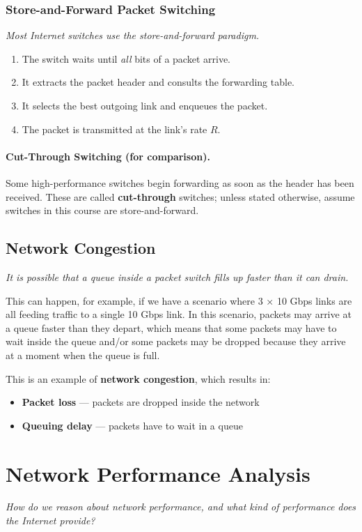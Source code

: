 \documentclass[../../compsys.tex]{subfiles}
\begin{document}
\subsubsection{Store-and-Forward Packet Switching}
\textit{Most Internet switches use the store-and-forward paradigm.}
\begin{enumerate}
  \item The switch waits until \emph{all} bits of a packet arrive.
  \item It extracts the packet header and consults the forwarding table.
  \item It selects the best outgoing link and enqueues the packet.
  \item The packet is transmitted at the link's rate \(R\).
\end{enumerate}

\paragraph{Cut-Through Switching (for comparison).}  
Some high-performance switches begin forwarding as soon as the header has been received.  These are called \textbf{cut-through} switches; unless stated otherwise, assume switches in this course are store-and-forward.

\subsection{Network Congestion}
\textit{It is possible that a queue inside a packet switch fills up faster than it can drain.}

This can happen, for example, if we have a scenario where 3 × 10 Gbps links are all feeding traffic to a single 10 Gbps link. In this scenario, packets may arrive at a queue faster than they depart, which means that some packets may have to wait inside the queue and/or some packets may be dropped because they arrive at a moment when the queue is full.

This is an example of \textbf{network congestion}, which results in:
\begin{itemize}
  \item \textbf{Packet loss} — packets are dropped inside the network
  \item \textbf{Queuing delay} — packets have to wait in a queue
\end{itemize}

\section{Network Performance Analysis}
\textit{How do we reason about network performance, and what kind of performance does the Internet provide?}
\end{document}

